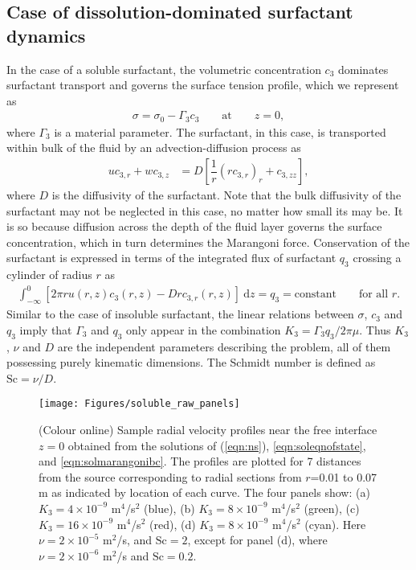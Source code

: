 \documentclass[]{jfm}
\newcommand{\diff}{\text{d}}
\newcommand{\Sc}{\text{Sc}}
\begin{document}
\subsection{Case of dissolution-dominated surfactant dynamics}
\label{subsec:casedissolved}
In the case of a soluble surfactant, the volumetric concentration $c_3$ dominates surfactant transport and governs the surface tension profile, which we represent as
\begin{align}
 \sigma = \sigma_0 - \Gamma_3 c_3 \qquad \text{at} \qquad z=0,
 \label{eqn:soleqnofstate}
\end{align}
where $\Gamma_3$ is a material parameter.
The surfactant, in this case, is transported within bulk of the fluid by an advection-diffusion process as
\begin{align}
 u c_{3,r} + w c_{3,z} &= D \left[ \dfrac{1}{r} \left( r c_{3,r} \right)_r +  c_{3,zz} \right],
 \label{eqn:solmarangonibc}
\end{align}
where $D$ is the diffusivity of the surfactant.
Note that the bulk diffusivity of the surfactant may not be neglected in this case, no matter how small its may be.
It is so because diffusion across the depth of the fluid layer governs the surface concentration, which in turn determines the Marangoni force.
Conservation of the surfactant is expressed in terms of the integrated flux of surfactant $q_3$ crossing a cylinder of radius $r$ as 
\begin{align}
 \int_{-\infty}^{0} \left[ 2\pi r u(r,z)  c_3(r,z)- D r c_{3,r}(r,z) \right]~\diff z = q_3=\text{constant} \qquad \text{for all } r.
 \label{eqn:solfluxcon}
\end{align}
Similar to the case of insoluble surfactant, the linear relations between $\sigma$, $c_3$ and $q_3$ imply that $\Gamma_3$ and $q_3$ only appear in the combination $K_3 = \Gamma_3 q_3/2\pi \mu$.
Thus $K_3$, $\nu$ and $D$ are the independent parameters describing the problem, all of them possessing purely kinematic dimensions.
The Schmidt number is defined as $\Sc = \nu/D$.
\begin{figure}
\centerline{\texttt{[image: Figures/soluble\_raw\_panels]}}
\caption{(Colour online) Sample radial velocity profiles near the free interface $z=0$ obtained from the solutions of (\ref{eqn:ns}), \eqref{eqn:soleqnofstate}, and \eqref{eqn:solmarangonibc}. 
The profiles are plotted for 7 distances from the source corresponding to radial sections from $r$=0.01 to 0.07 m as indicated by location of each curve. 
The four panels show: (a) $K_3 = 4\times 10^{-9}$ m$^4$/s$^2$ (blue), (b) $K_3 = 8 \times 10^{-9}$ m$^4$/s$^2$ (green), (c) $K_3 = 16 \times 10^{-9}$ m$^4$/s$^2$ (red), (d) $K_3 = 8 \times 10^{-9}$ m$^4$/s$^2$ (cyan). 
Here $\nu=2\times 10^{-5}$ m$^2$/s,  and $\Sc = 2$, except for panel (d), where $\nu=2 \times 10^{-6}$ m$^2$/s and $\Sc=0.2$.}
\label{fig:soluble_raw_panels}
\end{figure}
\end{document}
